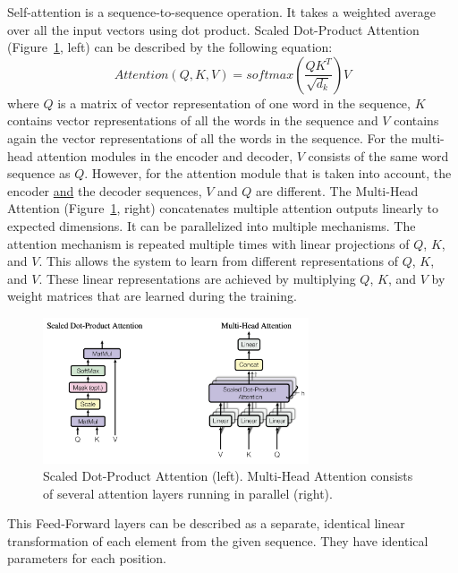 Self-attention is a sequence-to-sequence operation.
It takes a weighted average over all the input vectors using dot product.
Scaled Dot-Product Attention (Figure~\ref{fig:trans_attn}, left) can be described by the following equation:
\begin{equation} \label{eq:1}
Attention(Q,K,V) = softmax(\frac{QK^T}{\sqrt{d_k}})V
\end{equation}
where $Q$ is a matrix of vector representation of one word in the sequence,
$K$ contains vector representations of all the words in the sequence and
$V$ contains again the vector representations of all the words in the sequence.
For the multi-head attention modules in the encoder and decoder,
$V$ consists of the same word sequence as $Q$.
However, for the attention module that is taken into account,
the encoder \underline{and} the decoder sequences, $V$ and $Q$ are different.
The Multi-Head Attention (Figure~\ref{fig:trans_attn}, right) concatenates multiple
attention outputs linearly to expected dimensions.
It can be parallelized into multiple mechanisms.
The attention mechanism is repeated multiple times with linear projections of $Q$, $K$, and $V$.
This allows the system to learn from different representations of $Q$, $K$, and $V$.
These linear representations are achieved by multiplying $Q$, $K$,
and $V$ by weight matrices that are learned during the training.

\begin{figure}[h] %
    \centering
    \includegraphics[width=0.7\textwidth]{figures/03_blocks_overview.png} %
    \caption{Scaled Dot-Product Attention (left). Multi-Head Attention consists of several attention layers running in parallel (right). \cite{vaswani2017attention}} %
    \label{fig:trans_attn} %
\end{figure} 

This Feed-Forward layers can be described as a separate, identical linear transformation of each element from the given sequence. They have identical parameters for each position.

